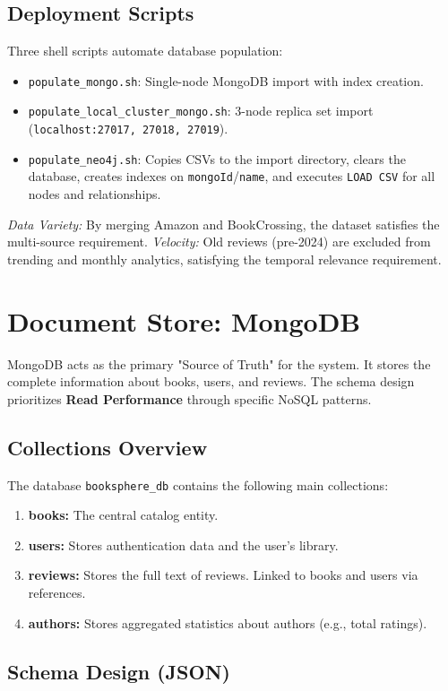 \subsection{Deployment Scripts}
Three shell scripts automate database population:
\begin{itemize}
    \item \texttt{populate\_mongo.sh}: Single-node MongoDB import with index creation.
    \item \texttt{populate\_local\_cluster\_mongo.sh}: 3-node replica set import (\texttt{localhost:27017, 27018, 27019}).
    \item \texttt{populate\_neo4j.sh}: Copies CSVs to the import directory, clears the database, creates indexes on \texttt{mongoId}/\texttt{name}, and executes \texttt{LOAD CSV} for all nodes and relationships.
\end{itemize}

\textit{Data Variety:} By merging Amazon and BookCrossing, the dataset satisfies the multi-source requirement. \textit{Velocity:} Old reviews (pre-2024) are excluded from trending and monthly analytics, satisfying the temporal relevance requirement.
\section{Document Store: MongoDB}
MongoDB acts as the primary "Source of Truth" for the system. It stores the complete information about books, users, and reviews. The schema design prioritizes \textbf{Read Performance} through specific NoSQL patterns.

\subsection{Collections Overview}
The database \texttt{booksphere\_db} contains the following main collections:

\begin{enumerate}
    \item \textbf{books:} The central catalog entity.
    \item \textbf{users:} Stores authentication data and the user's library.
    \item \textbf{reviews:} Stores the full text of reviews. Linked to books and users via references.
    \item \textbf{authors:} Stores aggregated statistics about authors (e.g., total ratings).
\end{enumerate}

\subsection{Schema Design (JSON)}

